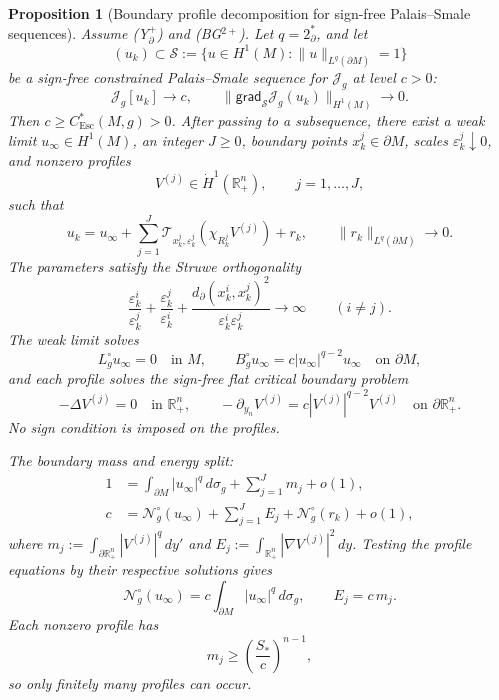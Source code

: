 \documentclass[11pt,reqno,a4paper]{amsart}
\newcommand{\R}{\mathbb{R}}
\numberwithin{equation}{section}
\theoremstyle{plain}
\newtheorem{proposition}[theorem]{Proposition}
\newcommand{\Esc}{\ensuremath{\mathrm{Esc}}}
\theoremstyle{remark}
\theoremstyle{plain}
\begin{document}
\begin{proposition}[Boundary profile decomposition for sign-free Palais--Smale sequences]
\label{prop:signfree-boundary-profile-decomposition}
Assume \textup{(Y$^+_\partial$)} and \textup{(BG$^{2+}$)}.  Let
$q=2^*_\partial$, and let
\[
(u_k)\subset\mathcal S
:=
\{u\in H^1(M):\|u\|_{L^q(\partial M)}=1\}
\]
be a sign-free constrained Palais--Smale sequence for $\mathcal J_g$ at level
$c>0$:
\[
\mathcal J_g[u_k]\to c,
\qquad
\|\mathsf{grad}_{\mathcal S}\mathcal J_g(u_k)\|_{H^1(M)}\to0.
\]
Then $c\ge C_{\Esc}^*(M,g)>0$.  After passing to a subsequence, there exist a
weak limit $u_\infty\in H^1(M)$, an integer $J\ge0$, boundary points
$x_k^j\in\partial M$, scales $\varepsilon_k^j\downarrow0$, and nonzero
profiles
\[
V^{(j)}\in\dot H^1(\R^n_+),
\qquad j=1,\dots,J,
\]
such that
\begin{equation}\label{eq:signfree-profile-decomp}
u_k
=
u_\infty
+
\sum_{j=1}^J
\mathcal T_{x_k^j,\varepsilon_k^j}(\chi_{R_k^j}V^{(j)})
+
r_k,
\qquad
\|r_k\|_{L^q(\partial M)}\to0.
\end{equation}
The parameters satisfy the Struwe orthogonality
\begin{equation}\label{eq:signfree-orthogonality}
\frac{\varepsilon_k^i}{\varepsilon_k^j}
+
\frac{\varepsilon_k^j}{\varepsilon_k^i}
+
\frac{d_\partial(x_k^i,x_k^j)^2}{\varepsilon_k^i\varepsilon_k^j}
\longrightarrow\infty
\qquad(i\ne j).
\end{equation}
The weak limit solves
\[
L_g^\circ u_\infty=0
\quad\text{in }M,
\qquad
B_g^\circ u_\infty
=
c|u_\infty|^{q-2}u_\infty
\quad\text{on }\partial M,
\]
and each profile solves the sign-free flat critical boundary problem
\[
-\Delta V^{(j)}=0\quad\text{in }\R^n_+,
\qquad
-\partial_{y_n}V^{(j)}
=
c|V^{(j)}|^{q-2}V^{(j)}
\quad\text{on }\partial\R^n_+.
\]
No sign condition is imposed on the profiles.

The boundary mass and energy split:
\begin{align}
1
&=
\int_{\partial M}|u_\infty|^q\,d\sigma_g
+
\sum_{j=1}^J m_j
+
o(1),
\label{eq:signfree-mass-split}\\
c
&=
\mathcal N_g^\circ(u_\infty)
+
\sum_{j=1}^J E_j
+
\mathcal N_g^\circ(r_k)
+
o(1),
\label{eq:signfree-energy-split}
\end{align}
where $m_j:=\int_{\partial\R^n_+}|V^{(j)}|^q\,dy'$ and
$E_j:=\int_{\R^n_+}|\nabla V^{(j)}|^2\,dy$.  Testing the profile equations
by their respective solutions gives
\[
\mathcal N_g^\circ(u_\infty)
=
c\int_{\partial M}|u_\infty|^q\,d\sigma_g,
\qquad
E_j=c\,m_j.
\]
Each nonzero profile has
\begin{equation}\label{eq:profile-mass-lower-bound}
m_j\ge\left(\frac{S_\ast}{c}\right)^{n-1},
\end{equation}
so only finitely many profiles can occur.
\end{proposition}
\end{document}
